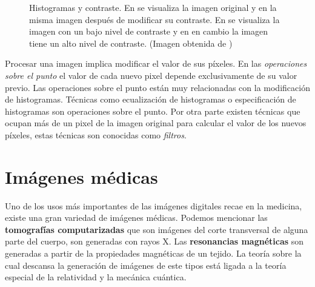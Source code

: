 \begin{figure}[h]
    \centering


    \bigskip


    \bigskip


  \caption[Histogramas y contraste]{Histogramas y contraste. En
  \protect{} se visualiza la imagen original y en
  \protect{} la misma imagen después de modificar su contraste. En
  \protect{} se visualiza la imagen con un bajo nivel de contraste
  y en \protect{} en cambio la imagen tiene un alto nivel de
  contraste. (Imagen obtenida de \cite{sipi})}
  \label{fig:histograms} 
\end{figure}

Procesar una imagen implica modificar el valor de sus píxeles. En las
\textit{operaciones sobre el punto} el valor de cada nuevo pixel depende
exclusivamente de su valor previo. Las operaciones sobre el punto están muy
relacionadas con la modificación de histogramas. Técnicas como ecualización de
histogramas o especificación de histogramas son operaciones sobre el punto. Por
otra parte existen técnicas que ocupan más de un pixel de la imagen original
para calcular el valor de los nuevos píxeles, estas técnicas son conocidas como
\textit{filtros}.

\section{Imágenes médicas}

Uno de los usos más importantes de las imágenes digitales recae en la medicina,
existe una gran variedad de imágenes médicas. Podemos mencionar las
\textbf{tomografías computarizadas} que son imágenes del corte transversal de
alguna parte del cuerpo, son generadas con rayos X. Las \textbf{resonancias
magnéticas} son generadas a partir de la propiedades magnéticas de un tejido.
La teoría sobre la cual descansa la generación de imágenes de este tipos está
ligada a la teoría especial de la relatividad y la mecánica cuántica.

